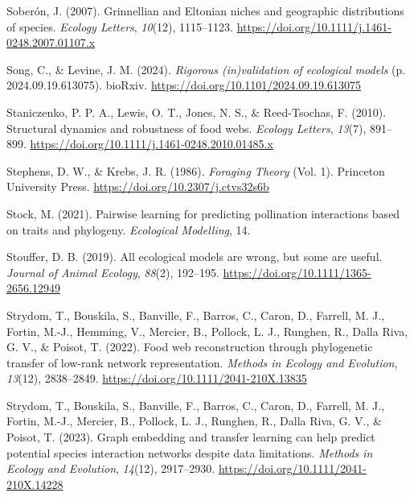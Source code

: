 \documentclass[
]{article}
\newlength{\cslhangindent}
\newenvironment{CSLReferences}[2] %
 {\begin{list}{}{%
  \setlength{\itemindent}{0pt}
  \setlength{\leftmargin}{0pt}
  \setlength{\parsep}{0pt}
  \ifodd #1
   \setlength{\leftmargin}{\cslhangindent}
   \setlength{\itemindent}{-1\cslhangindent}
  \fi
  \setlength{\itemsep}{#2\baselineskip}}}
 {\end{list}}
\begin{document}
\begin{CSLReferences}{1}{0}
Soberón, J. (2007). Grinnellian and {Eltonian} niches and geographic
distributions of species. \emph{Ecology Letters}, \emph{10}(12),
1115--1123. \url{https://doi.org/10.1111/j.1461-0248.2007.01107.x}

Song, C., \& Levine, J. M. (2024). \emph{Rigorous (in)validation of
ecological models} (p. 2024.09.19.613075). bioRxiv.
\url{https://doi.org/10.1101/2024.09.19.613075}

Staniczenko, P. P. A., Lewis, O. T., Jones, N. S., \& Reed-Tsochas, F.
(2010). Structural dynamics and robustness of food webs. \emph{Ecology
Letters}, \emph{13}(7), 891--899.
\url{https://doi.org/10.1111/j.1461-0248.2010.01485.x}

Stephens, D. W., \& Krebs, J. R. (1986). \emph{Foraging {Theory}} (Vol.
1). Princeton University Press.
\url{https://doi.org/10.2307/j.ctvs32s6b}

Stock, M. (2021). Pairwise learning for predicting pollination
interactions based on traits and phylogeny. \emph{Ecological Modelling},
14.

Stouffer, D. B. (2019). All ecological models are wrong, but some are
useful. \emph{Journal of Animal Ecology}, \emph{88}(2), 192--195.
\url{https://doi.org/10.1111/1365-2656.12949}

Strydom, T., Bouskila, S., Banville, F., Barros, C., Caron, D., Farrell,
M. J., Fortin, M.-J., Hemming, V., Mercier, B., Pollock, L. J., Runghen,
R., Dalla Riva, G. V., \& Poisot, T. (2022). Food web reconstruction
through phylogenetic transfer of low-rank network representation.
\emph{Methods in Ecology and Evolution}, \emph{13}(12), 2838--2849.
\url{https://doi.org/10.1111/2041-210X.13835}

Strydom, T., Bouskila, S., Banville, F., Barros, C., Caron, D., Farrell,
M. J., Fortin, M.-J., Mercier, B., Pollock, L. J., Runghen, R., Dalla
Riva, G. V., \& Poisot, T. (2023). Graph embedding and transfer learning
can help predict potential species interaction networks despite data
limitations. \emph{Methods in Ecology and Evolution}, \emph{14}(12),
2917--2930. \url{https://doi.org/10.1111/2041-210X.14228}


\end{CSLReferences}
\end{document}

